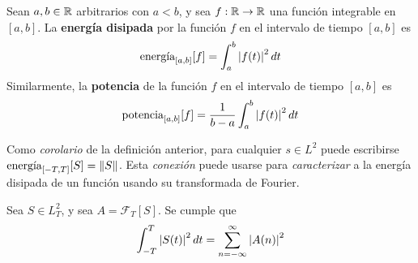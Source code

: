 
\begin{definicion}
Sean $a,b \in \mathbb{R}$ arbitrarios con $a<b$, y sea $f: \mathbb{R} \rightarrow \mathbb{R}$ una función integrable en $[a,b]$. La \textbf{energía disipada} por la función $f$ en el intervalo de tiempo $[a,b]$ es
\begin{equation}
\text{energía}_{[a,b]}[f] = \int_a^{b} \left| f(t) \right|^{2} dt
\end{equation}
Similarmente, la \textbf{potencia} de la función $f$ en el intervalo de tiempo $[a,b]$ es
\begin{equation}
\text{potencia}_{[a,b]}[f] = \frac{1}{b-a} \int_a^{b} \left| f(t) \right|^{2} dt
\end{equation}
\end{definicion}

Como \textit{corolario} de la definición anterior, para cualquier $s\in L^{2}$ puede escribirse $\text{energía}_{[-T,T]}[S] = \left\Vert S \right\Vert$.
%
Esta \textit{conexión} puede usarse para \textit{caracterizar} a la energía disipada de un función usando su transformada de Fourier.


\begin{teorema}[Parseval]
Sea $S \in L^{2}_T$, y sea $A = \mathcal{F}_T[S]$. Se cumple que
\begin{equation*}
\int_{-T}^{T} \left| S(t) \right|^{2} dt = \sum_{n=-\infty}^{\infty} \left| A(n) \right|^{2}
\end{equation*}
\label{parseval}
\end{teorema}


